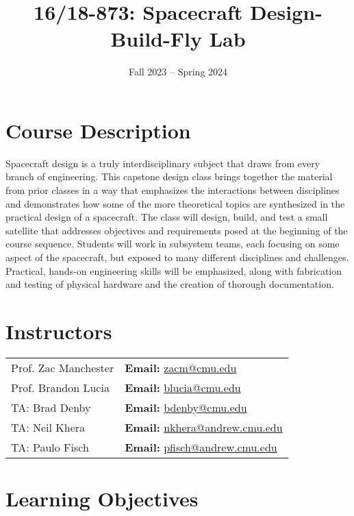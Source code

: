 \documentclass[11pt,letterpaper]{article}
\title{16/18-873: Spacecraft Design-Build-Fly Lab}
\author{Fall 2023 -- Spring 2024}
\date{}
\begin{document}
\maketitle

\section*{Course Description}

Spacecraft design is a truly interdisciplinary subject that draws from every branch of engineering. This capstone design class brings together the material from prior classes in a way that emphasizes the interactions between disciplines and demonstrates how some of the more theoretical topics are synthesized in the practical design of a spacecraft. The class will design, build, and test a small satellite that addresses objectives and requirements posed at the beginning of the course sequence. Students will work in subsystem teams, each focusing on some aspect of the spacecraft, but exposed to many different disciplines and challenges. Practical, hands-on engineering skills will be emphasized, along with fabrication and testing of physical hardware and the creation of thorough documentation.

\section*{Instructors}

\begin{center}
\begin{tabular}{l l}
	Prof. Zac Manchester & \textbf{Email:} \href{mailto:zacm@cmu.edu}{zacm@cmu.edu} \\
	Prof. Brandon Lucia & \textbf{Email:} \href{mailto:blucia@cmu.edu}{blucia@cmu.edu}
	\\
	TA: Brad Denby & \textbf{Email:} \href{mailto:bdenby@cmu.edu}{bdenby@cmu.edu}
	\\
	TA: Neil Khera & \textbf{Email:} \href{nkhera@andrew.cmu.edu}{nkhera@andrew.cmu.edu}
	\\
	TA: Paulo Fisch & \textbf{Email:} \href{pfisch@andrew.cmu.edu}{pfisch@andrew.cmu.edu}
\end{tabular}
\end{center}

\section*{Learning Objectives}
\end{document}
